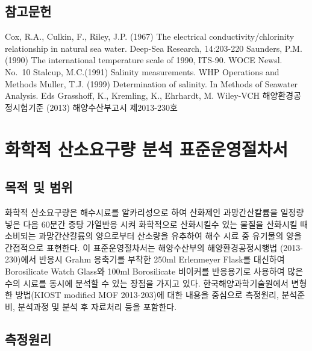\documentclass[
]{book}
\begin{document}
\hypertarget{uxcc38uxace0uxbb38uxd5cc-3}{%
\section{참고문헌}\label{uxcc38uxace0uxbb38uxd5cc-3}}

Cox, R.A., Culkin, F., Riley, J.P. (1967) The electrical conductivity/chlorinity relationship in natural sea water. Deep-Sea Research, 14:203-220
Saunders, P.M. (1990) The international temperature scale of 1990, ITS-90. WOCE Newsl. No.~10
Stalcup, M.C.(1991) Salinity measurements. WHP Operations and Methods
Muller, T.J. (1999) Determination of salinity. In Methods of Seawater Analysis. Eds Grasshoff, K., Kremling, K., Ehrhardt, M. Wiley-VCH
해양환경공정시험기준 (2013) 해양수산부고시 제2013-230호

\hypertarget{uxd654uxd559uxc801-uxc0b0uxc18cuxc694uxad6cuxb7c9-uxbd84uxc11d-uxd45cuxc900uxc6b4uxc601uxc808uxcc28uxc11c}{%
\chapter{화학적 산소요구량 분석 표준운영절차서}\label{uxd654uxd559uxc801-uxc0b0uxc18cuxc694uxad6cuxb7c9-uxbd84uxc11d-uxd45cuxc900uxc6b4uxc601uxc808uxcc28uxc11c}}

\hypertarget{uxbaa9uxc801-uxbc0f-uxbc94uxc704-2}{%
\section{목적 및 범위}\label{uxbaa9uxc801-uxbc0f-uxbc94uxc704-2}}

화학적 산소요구량은 해수시료를 알카리성으로 하여 산화제인 과망간산칼륨을 일정량 넣은 다음 60분간 중탕 가열반응 시켜 화학적으로 산화시킬수 있는 물질을 산화시킬 때 소비되는 과망간산칼륨의 양으로부터 산소량을 유추하여 해수 시료 중 유기물의 양을 간접적으로 표현한다. 이 표준운영절차서는 해양수산부의 해양환경공정시행법 (2013-230)에서 반응시 Grahm 응축기를 부착한 250ml Erlenmeyer Flask를 대신하여 Borosilicate Watch Glass와 100ml Borosilicate 비이커를 반응용기로 사용하여 많은 수의 시료를 동시에 분석할 수 있는 장점을 가지고 있다. 한국해양과학기술원에서 변형한 방법(KIOST modified MOF 2013-203)에 대한 내용을 중심으로 측정원리, 분석준비, 분석과정 및 분석 후 자료처리 등을 포함한다.

\hypertarget{uxce21uxc815uxc6d0uxb9ac-1}{%
\section{측정원리}\label{uxce21uxc815uxc6d0uxb9ac-1}}
\end{document}
